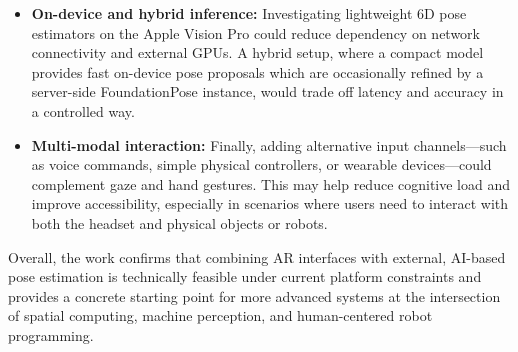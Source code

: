 \begin{itemize}
    \item \textbf{On-device and hybrid inference:}  
    Investigating lightweight 6D pose estimators on the Apple Vision Pro could reduce dependency on network connectivity and external GPUs. A hybrid setup, where a compact model provides fast on-device pose proposals which are occasionally refined by a server-side FoundationPose instance, would trade off latency and accuracy in a controlled way.

    \item \textbf{Multi-modal interaction:}  
    Finally, adding alternative input channels—such as voice commands, simple physical controllers, or wearable devices—could complement gaze and hand gestures. This may help reduce cognitive load and improve accessibility, especially in scenarios where users need to interact with both the headset and physical objects or robots.
\end{itemize}

Overall, the work confirms that combining AR interfaces with external, AI-based pose estimation is technically feasible under current platform constraints and provides a concrete starting point for more advanced systems at the intersection of spatial computing, machine perception, and human-centered robot programming.



